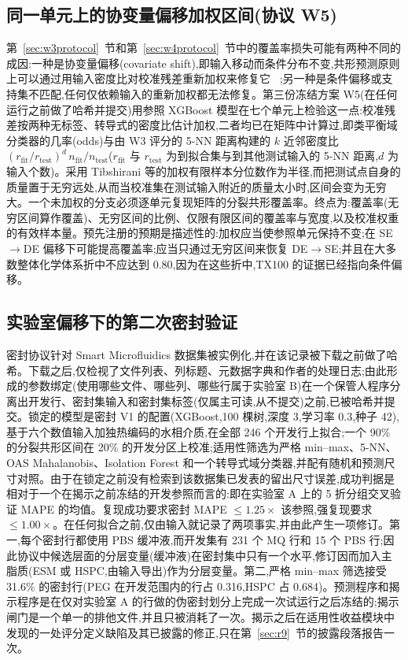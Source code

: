 \documentclass[11pt,a4paper]{ctexart}
\begin{document}
\subsection{同一单元上的协变量偏移加权区间(协议 W5)}
\label{sec:w5protocol}

第~\ref{sec:w3protocol}~节和第~\ref{sec:w4protocol}~节中的覆盖率损失可能有两种不同的成因:一种是协变量偏移(covariate shift),即输入移动而条件分布不变,共形预测原则上可以通过用输入密度比对校准残差重新加权来修复它 ~\cite{tibshirani2019};另一种是条件偏移或支持集不匹配,任何仅依赖输入的重新加权都无法修复。第三份冻结方案 W5(在任何运行之前做了哈希并提交)用参照 XGBoost 模型在七个单元上检验这一点:校准残差按两种无标签、转导式的密度比估计加权,二者均已在矩阵中计算过,即类平衡域分类器的几率(odds)与由 W3 评分的 5-NN 距离构建的 $k$ 近邻密度比 $(r_{\mathrm{fit}}/r_{\mathrm{test}})^{d}\,n_{\mathrm{fit}}/n_{\mathrm{test}}$($r_{\mathrm{fit}}$ 与 $r_{\mathrm{test}}$ 为到拟合集与到其他测试输入的 5-NN 距离,$d$ 为输入个数)。采用 Tibshirani 等的加权有限样本分位数作为半径,而把测试点自身的质量置于无穷远处,从而当校准集在测试输入附近的质量太小时,区间会变为无穷大。一个未加权的分支必须逐单元复现矩阵的分裂共形覆盖率。终点为:覆盖率(无穷区间算作覆盖)、无穷区间的比例、仅限有限区间的覆盖率与宽度,以及校准权重的有效样本量。预先注册的预期是描述性的:加权应当使参照单元保持不变;在 SE$\to$DE 偏移下可能提高覆盖率;应当只通过无穷区间来恢复 DE$\to$SE;并且在大多数整体化学体系折中不应达到 0.80,因为在这些折中,TX100 的证据已经指向条件偏移。

\subsection{实验室偏移下的第二次密封验证}
\label{sec:d3protocol}

密封协议针对 Smart Microfluidics 数据集被实例化,并在该记录被下载之前做了哈希。下载之后,仅检视了文件列表、列标题、元数据字典和作者的处理日志;由此形成的参数绑定(使用哪些文件、哪些列、哪些行属于实验室 B)在一个保管人程序分离出开发行、密封集输入和密封集标签(仅属主可读,从不提交)之前,已被哈希并提交。锁定的模型是密封 V1 的配置(XGBoost,100 棵树,深度 3,学习率 0.3,种子 42),基于六个数值输入加独热编码的水相介质,在全部 246 个开发行上拟合;一个 90\% 的分裂共形区间在 20\% 的开发分区上校准;适用性筛选为严格 min–max、5-NN、OAS Mahalanobis、Isolation Forest 和一个转导式域分类器,并配有随机和预测尺寸对照。由于在锁定之前没有检索到该数据集已发表的留出尺寸误差,成功判据是相对于一个在揭示之前冻结的开发参照而言的:即在实验室 A 上的 5 折分组交叉验证 MAPE 的均值。复现成功要求密封 MAPE $\le 1.25\times$ 该参照,强复现要求 $\le 1.00\times$。在任何拟合之前,仅由输入就记录了两项事实,并由此产生一项修订。第一,每个密封行都使用 PBS 缓冲液,而开发集有 231 个 MQ 行和 15 个 PBS 行;因此协议中候选层面的分层变量(缓冲液)在密封集中只有一个水平,修订因而加入主脂质(ESM 或 HSPC,由输入导出)作为分层变量。第二,严格 min–max 筛选接受 31.6\% 的密封行(PEG 在开发范围内的行占 0.316,HSPC 占 0.684)。预测程序和揭示程序是在仅对实验室 A 的行做的伪密封划分上完成一次试运行之后冻结的;揭示闸门是一个单一的排他文件,并且只被消耗了一次。揭示之后在适用性收益模块中发现的一处评分定义缺陷及其已披露的修正,只在第~\ref{sec:r9}~节的披露段落报告一次。
\end{document}
